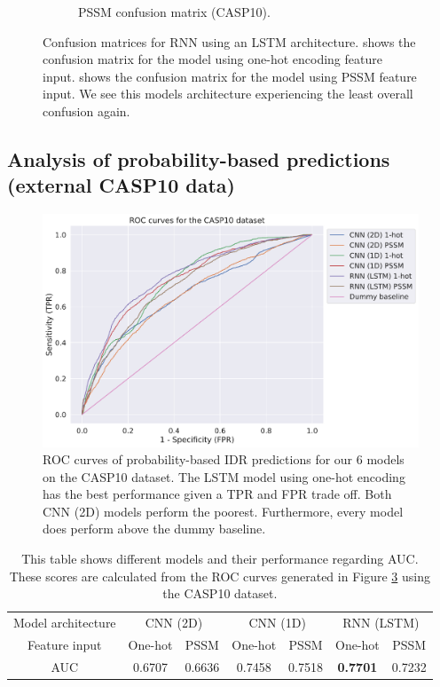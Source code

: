 \documentclass{l4proj}
\begin{document}
\begin{figure}[!htb]
\begin{subfigure}[b]{0.48\textwidth}
        \caption{PSSM confusion matrix (CASP10).}
        \label{fig:caspcfrnnpssm}
    \end{subfigure}
    \caption{Confusion matrices for RNN using an LSTM architecture.  shows the confusion matrix for the model using one-hot encoding feature input.  shows the confusion matrix for the model using PSSM feature input. We see this models architecture experiencing the least overall confusion again.}
    \label{fig:caspcfrnn}
\end{figure}

\subsection{Analysis of probability-based predictions (external CASP10 data)}

\begin{figure}[!htb]
    \centering
    \includegraphics[width=0.95\linewidth]{images/CASPROC.pdf}    

    \caption{ROC curves of probability-based IDR predictions for our 6 models on the CASP10 dataset. The LSTM model using one-hot encoding has the best performance given a TPR and FPR trade off. Both CNN (2D) models perform the poorest. Furthermore, every model does perform above the dummy baseline.}

    \label{fig:roccasp} 
\end{figure}

\begin{table}[!htb]
    \centering
    \caption{This table shows different models and their performance regarding AUC. These scores are calculated from the ROC curves generated in Figure \ref{fig:roccasp} using the CASP10 dataset.}
    \begin{tabular}{@{}ccccccc@{}}
    \toprule
    Model architecture & \multicolumn{2}{c}{CNN (2D)} & \multicolumn{2}{c}{CNN (1D)} & \multicolumn{2}{c}{RNN (LSTM)} \\ \cmidrule{0-0}
    Feature input & One-hot & PSSM & One-hot & PSSM & One-hot & PSSM \\ \midrule
    AUC & 0.6707 & 0.6636 & 0.7458 & 0.7518 & \textbf{0.7701} & 0.7232 \\ \bottomrule
    \end{tabular}
    
    \label{tab:auccasp}
\end{table}
\end{document}
